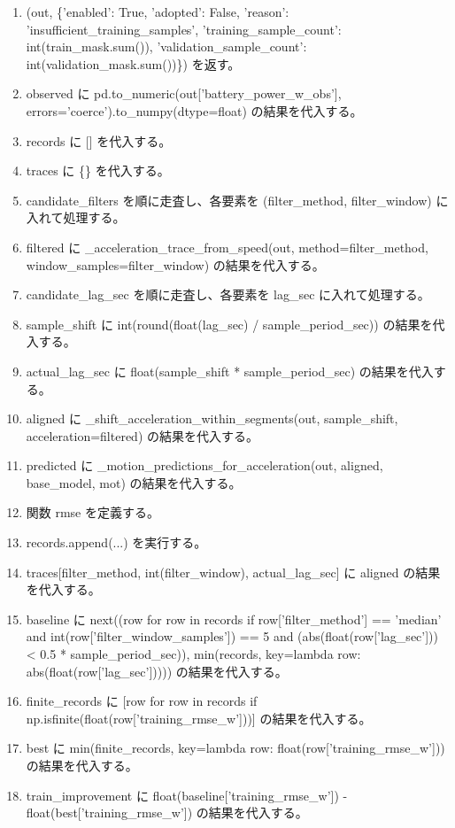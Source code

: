 \documentclass[a4paper,11pt]{article}
\begin{document}
\begin{enumerate}[leftmargin=1.8em]
\item   (out, \{'enabled': True, 'adopted': False, 'reason': 'insufficient\_training\_samples', 'training\_sample\_count': int(train\_mask.sum()), 'validation\_sample\_count': int(validation\_mask.sum())\}) を返す。
\item observed に pd.to\_numeric(out['battery\_power\_w\_obs'], errors='coerce').to\_numpy(dtype=float) の結果を代入する。
\item records に [] を代入する。
\item traces に \{\} を代入する。
\item candidate\_filters を順に走査し、各要素を (filter\_method, filter\_window) に入れて処理する。
\item   filtered に \_acceleration\_trace\_from\_speed(out, method=filter\_method, window\_samples=filter\_window) の結果を代入する。
\item   candidate\_lag\_sec を順に走査し、各要素を lag\_sec に入れて処理する。
\item     sample\_shift に int(round(float(lag\_sec) / sample\_period\_sec)) の結果を代入する。
\item     actual\_lag\_sec に float(sample\_shift * sample\_period\_sec) の結果を代入する。
\item     aligned に \_shift\_acceleration\_within\_segments(out, sample\_shift, acceleration=filtered) の結果を代入する。
\item     predicted に \_motion\_predictions\_for\_acceleration(out, aligned, base\_model, mot) の結果を代入する。
\item     関数 rmse を定義する。
\item     records.append(...) を実行する。
\item     traces[filter\_method, int(filter\_window), actual\_lag\_sec] に aligned の結果を代入する。
\item baseline に next((row for row in records if row['filter\_method'] == 'median' and int(row['filter\_window\_samples']) == 5 and (abs(float(row['lag\_sec'])) < 0.5 * sample\_period\_sec)), min(records, key=lambda row: abs(float(row['lag\_sec'])))) の結果を代入する。
\item finite\_records に [row for row in records if np.isfinite(float(row['training\_rmse\_w']))] の結果を代入する。
\item best に min(finite\_records, key=lambda row: float(row['training\_rmse\_w'])) の結果を代入する。
\item train\_improvement に float(baseline['training\_rmse\_w']) - float(best['training\_rmse\_w']) の結果を代入する。

\end{enumerate}
\end{document}
